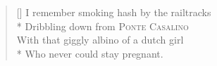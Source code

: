 \settowidth{\versewidth}{I remember smoking hash by the railtracks}
\begin{verse}[\versewidth]
I remember smoking hash by the railtracks\\*
\vin Dribbling down from \textsc{Ponte Casalino}\\
With that giggly albino of a dutch girl\\*
\vin Who never could stay pregnant.
\end{verse}
